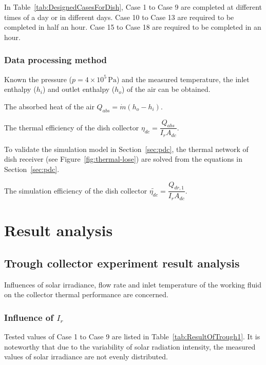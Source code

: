 In Table~\ref{tab:DesignedCasesForDish}, Case 1 to Case 9 are completed at different times of a day or in different days. Case 10 to Case 13 are required to be completed in half an hour. Case 15 to Case 18 are required to be completed in an hour.

\subsubsection{Data processing method}
Known the pressure ($p = 4\times10^5\,\mathrm{Pa}$) and the measured temperature, the inlet enthalpy ($h_i$) and outlet enthalpy ($h_o$) of the air can be obtained.

The absorbed heat of the air $Q_{abs} = \dot{m}(h_o - h_i)$.

The thermal efficiency of the dish collector $\eta_{dc} = \dfrac{Q_{abs}}{I_r A_{dc}}$. 

To validate the simulation model in Section~\ref{sec:pdc}, %
the thermal network of dish receiver (see Figure~\ref{fig:thermal-lose}) are solved from the equations in Section~\ref{sec:pdc}.

The simulation efficiency of the dish collector $\widetilde{\eta_{dc}} = \dfrac{Q_{dr,1}}{I_r A_{dc}}$.

\section{Result analysis}
\subsection{Trough collector experiment result analysis}
Influences of solar irradiance, flow rate and inlet temperature of the working fluid on the collector thermal performance are concerned.
\subsubsection{Influence of $I_r$}
Tested values of Case 1 to Case 9 are listed in Table~\ref{tab:ResultOfTrough1}. It is noteworthy that due to the variability of solar radiation intensity, the measured values of solar irradiance are not evenly distributed.

